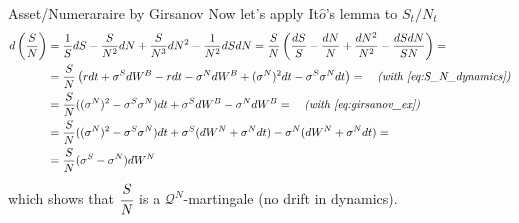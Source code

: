 \documentclass{beamer}
\begin{document}
\begin{frame}{Asset/Numeraraire by Girsanov}
  Now let's apply It$\hat{o}$'s lemma to $S_t/N_t$
  \begin{equation*}
    \begin{aligned}
      d\left(\frac{S}{N}\right) &= \frac{1}{S}dS - \frac{S}{N^2}dN + \frac{S}{N^3}dN^2-\frac{1}{N^2}dSdN = \frac{S}{N}\left(\frac{dS}{S}-\frac{dN}{N}+\frac{dN^2}{N^2}-\frac{dSdN}{SN} \right) = \\
      &=\frac{S}{N}\left(rdt+\sigma^S dW^B - rdt - \sigma^N dW^B + (\sigma^N)^2 dt - \sigma^S\sigma^N dt \right) = \quad\textit{(with \cref{eq:S_N_dynamics})}\\
      &=\frac{S}{N}((\sigma^N)^2 - \sigma^S\sigma^N) dt + \sigma^S dW^B - \sigma^N dW^B = \quad\textit{(with \cref{eq:girsanov_ex})}\\
      &=\frac{S}{N}((\sigma^N)^2 - \sigma^S\sigma^N) dt + \sigma^S (dW^N + \sigma^N dt) - \sigma^N(dW^N+\sigma^Ndt) = \\
      &=\frac{S}{N}(\sigma^S - \sigma^N)dW^N 
      \end{aligned}
  \end{equation*}
  which shows that $\cfrac{S}{N}$ is a $\mathcal{Q}^N$-martingale (no drift in dynamics).
\end{frame}

\end{document}
